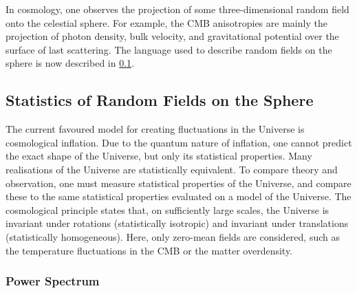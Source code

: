 



In cosmology, one observes the projection of some three-dimensional random field onto the celestial sphere.
For example, the CMB anisotropies are mainly the projection of photon density, bulk velocity, and gravitational potential over the surface of last scattering.
The language used to describe random fields on the sphere is now described in \cref{sec:chapter2_statistics_random_fields_sphere}.

\subsection{Statistics of Random Fields on the Sphere}\label{sec:chapter2_statistics_random_fields_sphere}

The current favoured model for creating fluctuations in the Universe is cosmological inflation.
Due to the quantum nature of inflation, one cannot predict the exact shape of the Universe, but only its statistical properties.
Many realisations of the Universe are statistically equivalent.
To compare theory and observation, one must measure statistical properties of the Universe, and compare these to the same statistical properties evaluated on a model of the Universe.
The cosmological principle states that, on sufficiently large scales, the Universe is invariant under rotations (statistically isotropic) and invariant under translations (statistically homogeneous).
Here, only zero-mean fields are considered, such as the temperature fluctuations in the CMB or the matter overdensity.

\subsubsection{Power Spectrum}

